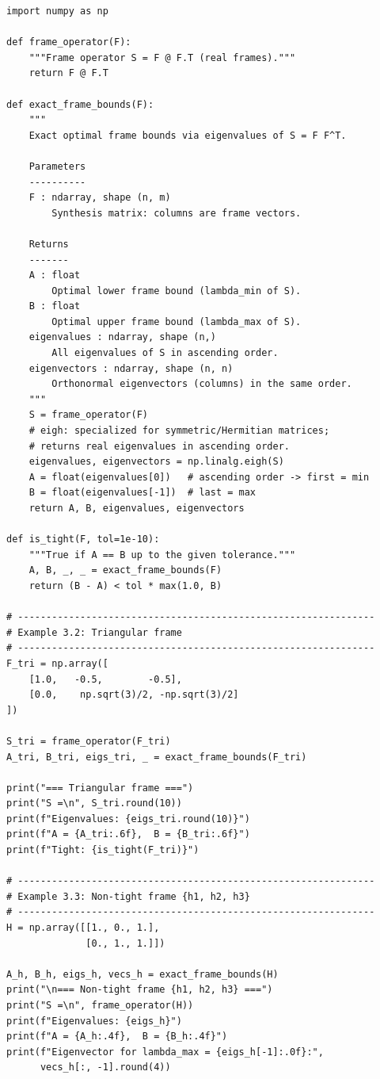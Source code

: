 \begin{lstlisting}[caption={Frame operator and exact bounds via eigenvalues}]
import numpy as np

def frame_operator(F):
    """Frame operator S = F @ F.T (real frames)."""
    return F @ F.T

def exact_frame_bounds(F):
    """
    Exact optimal frame bounds via eigenvalues of S = F F^T.

    Parameters
    ----------
    F : ndarray, shape (n, m)
        Synthesis matrix: columns are frame vectors.

    Returns
    -------
    A : float
        Optimal lower frame bound (lambda_min of S).
    B : float
        Optimal upper frame bound (lambda_max of S).
    eigenvalues : ndarray, shape (n,)
        All eigenvalues of S in ascending order.
    eigenvectors : ndarray, shape (n, n)
        Orthonormal eigenvectors (columns) in the same order.
    """
    S = frame_operator(F)
    # eigh: specialized for symmetric/Hermitian matrices;
    # returns real eigenvalues in ascending order.
    eigenvalues, eigenvectors = np.linalg.eigh(S)
    A = float(eigenvalues[0])   # ascending order -> first = min
    B = float(eigenvalues[-1])  # last = max
    return A, B, eigenvalues, eigenvectors

def is_tight(F, tol=1e-10):
    """True if A == B up to the given tolerance."""
    A, B, _, _ = exact_frame_bounds(F)
    return (B - A) < tol * max(1.0, B)

# ---------------------------------------------------------------
# Example 3.2: Triangular frame
# ---------------------------------------------------------------
F_tri = np.array([
    [1.0,   -0.5,        -0.5],
    [0.0,    np.sqrt(3)/2, -np.sqrt(3)/2]
])

S_tri = frame_operator(F_tri)
A_tri, B_tri, eigs_tri, _ = exact_frame_bounds(F_tri)

print("=== Triangular frame ===")
print("S =\n", S_tri.round(10))
print(f"Eigenvalues: {eigs_tri.round(10)}")
print(f"A = {A_tri:.6f},  B = {B_tri:.6f}")
print(f"Tight: {is_tight(F_tri)}")

# ---------------------------------------------------------------
# Example 3.3: Non-tight frame {h1, h2, h3}
# ---------------------------------------------------------------
H = np.array([[1., 0., 1.],
              [0., 1., 1.]])

A_h, B_h, eigs_h, vecs_h = exact_frame_bounds(H)
print("\n=== Non-tight frame {h1, h2, h3} ===")
print("S =\n", frame_operator(H))
print(f"Eigenvalues: {eigs_h}")
print(f"A = {A_h:.4f},  B = {B_h:.4f}")
print(f"Eigenvector for lambda_max = {eigs_h[-1]:.0f}:",
      vecs_h[:, -1].round(4))


\end{lstlisting}
